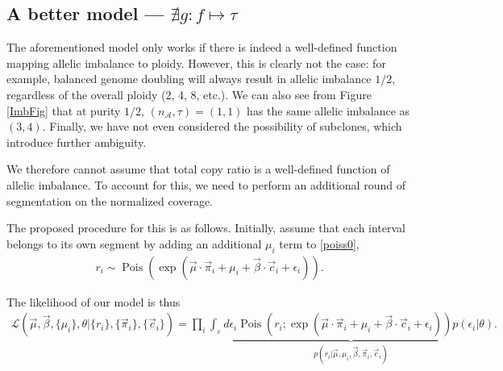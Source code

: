 \documentclass[10pt,letter]{article}
\numberwithin{equation}{section}
\newcommand{\textop}[1]{\operatorname{#1}}
\begin{document}
\subsection{A better model --- $\nexists g : f\mapsto\tau$}


The aforementioned model only works if there is indeed a well-defined function mapping allelic imbalance to ploidy. However, this is clearly not the case: for example, balanced genome doubling will always result in allelic imbalance $1/2$, regardless of the overall ploidy (2, 4, 8, etc.). We can also see from Figure \ref{ImbFig} that at purity $1/2$, $(n_\mathcal{A},\tau) = (1, 1)$ has the same allelic imbalance as $(3, 4)$. Finally, we have not even considered the possibility of subclones, which introduce further ambiguity.

We therefore cannot assume that total copy ratio is a well-defined function of allelic imbalance. To account for this, we need to perform an additional round of segmentation on the normalized coverage.

The proposed procedure for this is as follows. Initially, assume that each interval belongs to its own segment by adding an additional $\mu_i$ term to \eqref{poiss0},
\begin{align*}
r_i \sim \textop{Pois}(\exp(\vec\mu\cdot\vec \pi_i + \mu_i + \vec\beta\cdot\vec c_i + \epsilon_i)).
\end{align*}

The likelihood of our model is thus
\begin{align*}
\mathcal{L}(\vec \mu,\vec\beta,\{\mu_i\},\theta|\{r_i\},\{\vec \pi_i\},\{\vec c_i\}) = \prod_i \underbrace{\int_{\varepsilon} d\epsilon_i \textop{Pois}(r_i;\exp(\vec\mu\cdot\vec \pi_i + \mu_i + \vec\beta\cdot\vec c_i + \epsilon_i))p(\epsilon_i|\theta)}_{p(r_i|\vec\mu,\mu_i,\vec \beta,\vec \pi_i, \vec c_i)}.
\end{align*}
\end{document}
